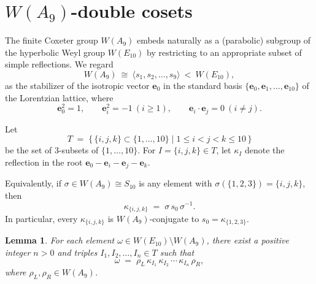 \documentclass[11pt]{amsart}
\numberwithin{equation}{section}
\newtheorem{lem}[thm]{Lemma}
\newcommand{\vve}{\mathbf{e}}
\begin{document}
\section{$W(A_9)$-double cosets}\label{S:doubleCosets}



The finite Coxeter group \(W(A_9)\) embeds naturally as a (parabolic) subgroup of the
hyperbolic Weyl group \(W(E_{10})\) by restricting to an appropriate subset of simple reflections.
We regard
\[
W(A_9) \ \cong\ \langle s_1,s_2,\dots,s_9\rangle \ <\  W(E_{10}),
\]
as the stabilizer of the isotropic vector \(\vve_0\) in the standard basis
\(\{\vve_0,\vve_1,\dots,\vve_{10}\}\) of the Lorentzian lattice,
where
\[
\vve_0^2 = 1, \qquad \vve_i^2 = -1 \ (i\ge1), \qquad \vve_i\!\cdot \vve_j = 0 \ (i\ne j).
\]


\medskip
Let
\[
T \;=\; \bigl\{\, \{i,j,k\}\subset\{1,\dots,10\} \;\big|\; 1\le i<j<k\le 10 \,\bigr\}
\]
be the set of 3-subsets of \(\{1,\dots,10\}\).
For \(I=\{i,j,k\}\in T\), let \(\kappa_I\) denote the reflection in the root
\(\vve_0-\vve_i-\vve_j-\vve_k\).

Equivalently, if \(\sigma\in W(A_9)\cong S_{10}\) is any element with
\(\sigma(\{1,2,3\})=\{i,j,k\}\), then
\[
\kappa_{\{i,j,k\}} \;=\; \sigma\, s_0\, \sigma^{-1}.
\]
In particular, every \(\kappa_{\{i,j,k\}}\) is \(W(A_9)\)-conjugate to \(s_0=\kappa_{\{1,2,3\}}\).


\begin{lem}\label{L:kappaDecomposition}
For each element \(\omega \in W(E_{10}) \setminus W(A_9)\), 
there exist a positive integer \(n>0\) and triples 
\(I_1, I_2, \dots, I_n \in T\) such that
\[
\omega \;=\; \rho_L\, \kappa_{I_1}\, \kappa_{I_2}\, \cdots\, \kappa_{I_n}\, \rho_R,
\]
where \(\rho_L, \rho_R \in W(A_9)\).
\end{lem}
\end{document}
